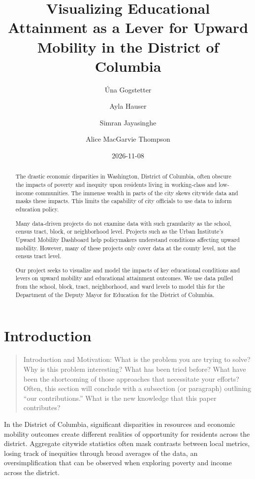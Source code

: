 \documentclass[
  letterpaper,
  DIV=11,
  numbers=noendperiod]{scrartcl}
\title{Visualizing Educational Attainment as a Lever for Upward Mobility
in the District of Columbia}
\author{Úna Gogstetter \and Ayla Hauser \and Simran
Jayasinghe \and Alice MacGarvie Thompson}
\date{2026-11-08}
\begin{document}
\maketitle
\begin{abstract}
The drastic economic disparities in Washington, District of Columbia,
often obscure the impacts of poverty and inequity upon residents living
in working-class and low-income communities. The immense wealth in parts
of the city skews citywide data and masks these impacts. This limits the
capability of city officials to use data to inform education policy.

Many data-driven projects do not examine data with such granularity as
the school, census tract, block, or neighborhood level. Projects such as
the Urban Institute's Upward Mobility Dashboard help policymakers
understand conditions affecting upward mobility. However, many of these
projects only cover data at the county level, not the census tract
level.

Our project seeks to visualize and model the impacts of key educational
conditions and levers on upward mobility and educational attainment
outcomes. We use data pulled from the school, block, tract,
neighborhood, and ward levels to model this for the Department of the
Deputy Mayor for Education for the District of Columbia.
\end{abstract}


\section{Introduction}\label{introduction}

\begin{quote}
Introduction and Motivation: What is the problem you are trying to
solve? Why is this problem interesting? What has been tried before? What
have been the shortcoming of those approaches that necessitate your
efforts? Often, this section will conclude with a subsection (or
paragraph) outlining ``our contributions.'' What is the new knowledge
that this paper contributes?
\end{quote}

In the District of Columbia, significant disparities in resources and
economic mobility outcomes create different realities of opportunity for
residents across the district. Aggregate citywide statistics often mask
contrasts between local metrics, losing track of inequities through
broad averages of the data, an oversimplification that can be observed
when exploring poverty and income across the district.
\end{document}
